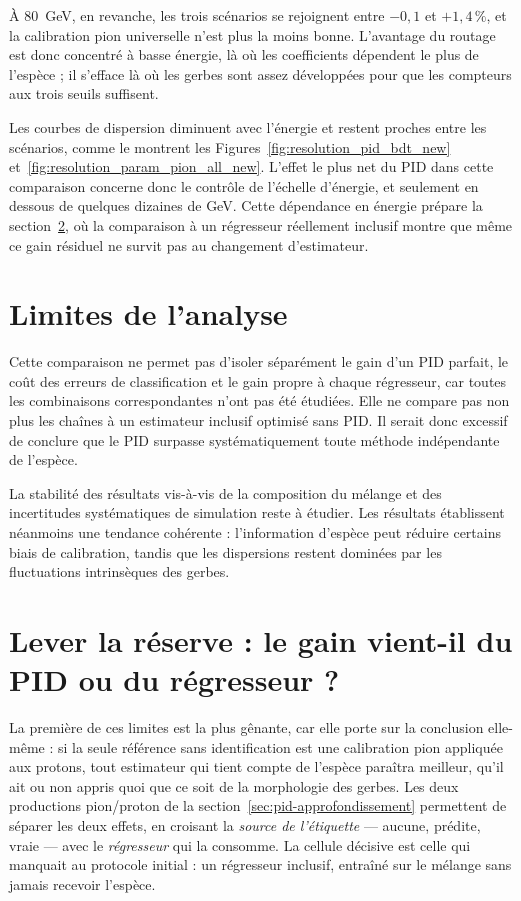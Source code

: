 À 80~GeV, en revanche, les trois scénarios se rejoignent entre $-0{,}1$ et $+1{,}4\,\%$, et la calibration pion universelle n'est plus la moins bonne. L'avantage du routage est donc concentré à basse énergie, là où les coefficients dépendent le plus de l'espèce ; il s'efface là où les gerbes sont assez développées pour que les compteurs aux trois seuils suffisent.

Les courbes de dispersion diminuent avec l'énergie et restent proches entre les scénarios, comme le montrent les Figures~\ref{fig:resolution_pid_bdt_new} et~\ref{fig:resolution_param_pion_all_new}. L'effet le plus net du PID dans cette comparaison concerne donc le contrôle de l'échelle d'énergie, et seulement en dessous de quelques dizaines de GeV. Cette dépendance en énergie prépare la section~\ref{sec:coupling-revision}, où la comparaison à un régresseur réellement inclusif montre que même ce gain résiduel ne survit pas au changement d'estimateur.

\section{Limites de l'analyse}
\label{sec:mixte-limites}

Cette comparaison ne permet pas d'isoler séparément le gain d'un PID parfait, le coût des erreurs de classification et le gain propre à chaque régresseur, car toutes les combinaisons correspondantes n'ont pas été étudiées. Elle ne compare pas non plus les chaînes à un estimateur inclusif optimisé sans PID. Il serait donc excessif de conclure que le PID surpasse systématiquement toute méthode indépendante de l'espèce.

La stabilité des résultats vis-à-vis de la composition du mélange et des incertitudes systématiques de simulation reste à étudier. Les résultats établissent néanmoins une tendance cohérente : l'information d'espèce peut réduire certains biais de calibration, tandis que les dispersions restent dominées par les fluctuations intrinsèques des gerbes.

\section{Lever la réserve : le gain vient-il du PID ou du régresseur ?}
\label{sec:coupling-revision}

La première de ces limites est la plus gênante, car elle porte sur la conclusion elle-même : si la seule référence sans identification est une calibration pion appliquée aux protons, tout estimateur qui tient compte de l'espèce paraîtra meilleur, qu'il ait ou non appris quoi que ce soit de la morphologie des gerbes. Les deux productions pion/proton de la section~\ref{sec:pid-approfondissement} permettent de séparer les deux effets, en croisant la \emph{source de l'étiquette} — aucune, prédite, vraie — avec le \emph{régresseur} qui la consomme. La cellule décisive est celle qui manquait au protocole initial : un régresseur inclusif, entraîné sur le mélange sans jamais recevoir l'espèce.

